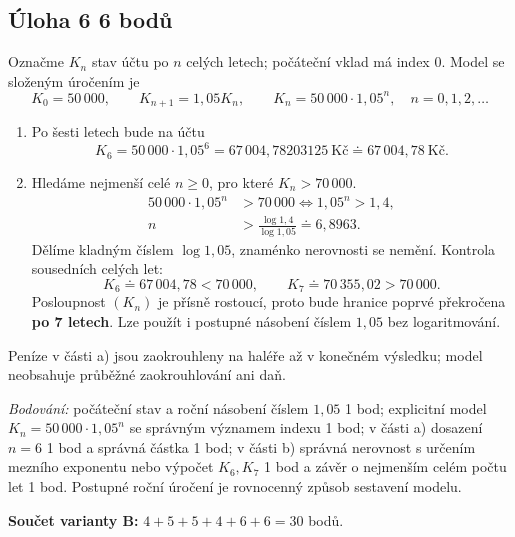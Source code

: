 \documentclass[a4paper,11pt]{article}
\begin{document}
\subsection*{Úloha 6 \hfill 6 bodů}
Označme $K_n$ stav účtu po $n$ celých letech; počáteční vklad má index $0$.
Model se složeným úročením je
\[
    K_0=50\,000,\qquad K_{n+1}=1{,}05K_n,\qquad
    K_n=50\,000\cdot1{,}05^n,\quad n=0,1,2,\ldots
\]
\begin{enumerate}[label=\alph*)]
    \item Po šesti letech bude na účtu
    \[
        K_6=50\,000\cdot1{,}05^6
        =67\,004{,}78203125\ \text{Kč}
        \doteq67\,004{,}78\ \text{Kč}.
    \]
    \item Hledáme nejmenší celé $n\ge0$, pro které $K_n>70\,000$.
    \begin{align*}
        50\,000\cdot1{,}05^n&>70\,000
        \iff 1{,}05^n>1{,}4,\\
        n&>\frac{\log1{,}4}{\log1{,}05}\doteq6{,}8963.
    \end{align*}
    Dělíme kladným číslem $\log1{,}05$, znaménko nerovnosti se nemění.
    Kontrola sousedních celých let:
    \[
        K_6\doteq67\,004{,}78<70\,000,
        \qquad K_7\doteq70\,355{,}02>70\,000.
    \]
    Posloupnost $(K_n)$ je přísně rostoucí, proto bude hranice poprvé
    překročena \textbf{po 7 letech}. Lze použít i postupné násobení
    číslem $1{,}05$ bez logaritmování.
\end{enumerate}
Peníze v části a) jsou zaokrouhleny na haléře až v konečném výsledku;
model neobsahuje průběžné zaokrouhlování ani daň.

\textit{Bodování:} počáteční stav a roční násobení číslem $1{,}05$
1 bod; explicitní model $K_n=50\,000\cdot1{,}05^n$ se správným významem
indexu 1 bod; v části a) dosazení $n=6$ 1 bod a správná částka 1 bod;
v části b) správná nerovnost s určením mezního exponentu nebo výpočet
$K_6,K_7$ 1 bod a závěr o nejmenším celém počtu let 1 bod.
Postupné roční úročení je rovnocenný způsob sestavení modelu.

\medskip
\textbf{Součet varianty B:} $4+5+5+4+6+6=30$ bodů.

\end{document}
